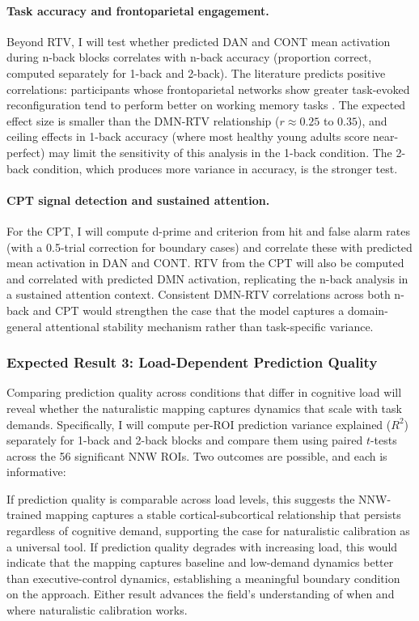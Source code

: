 \paragraph{Task accuracy and frontoparietal engagement.} Beyond RTV, I will test whether predicted DAN and CONT mean activation during n-back blocks correlates with n-back accuracy (proportion correct, computed separately for 1-back and 2-back). The literature predicts positive correlations: participants whose frontoparietal networks show greater task-evoked reconfiguration tend to perform better on working memory tasks \citep{braun2015, cole2013}. The expected effect size is smaller than the DMN-RTV relationship ($r \approx 0.25$ to $0.35$), and ceiling effects in 1-back accuracy (where most healthy young adults score near-perfect) may limit the sensitivity of this analysis in the 1-back condition. The 2-back condition, which produces more variance in accuracy, is the stronger test.

\paragraph{CPT signal detection and sustained attention.} For the CPT, I will compute d-prime and criterion from hit and false alarm rates (with a 0.5-trial correction for boundary cases) and correlate these with predicted mean activation in DAN and CONT. RTV from the CPT will also be computed and correlated with predicted DMN activation, replicating the n-back analysis in a sustained attention context. Consistent DMN-RTV correlations across both n-back and CPT would strengthen the case that the model captures a domain-general attentional stability mechanism rather than task-specific variance.

\subsubsection{Expected Result 3: Load-Dependent Prediction Quality}

Comparing prediction quality across conditions that differ in cognitive load will reveal whether the naturalistic mapping captures dynamics that scale with task demands. Specifically, I will compute per-ROI prediction variance explained ($R^2$) separately for 1-back and 2-back blocks and compare them using paired $t$-tests across the 56 significant NNW ROIs. Two outcomes are possible, and each is informative:

If prediction quality is comparable across load levels, this suggests the NNW-trained mapping captures a stable cortical-subcortical relationship that persists regardless of cognitive demand, supporting the case for naturalistic calibration as a universal tool. If prediction quality degrades with increasing load, this would indicate that the mapping captures baseline and low-demand dynamics better than executive-control dynamics, establishing a meaningful boundary condition on the approach. Either result advances the field's understanding of when and where naturalistic calibration works.

